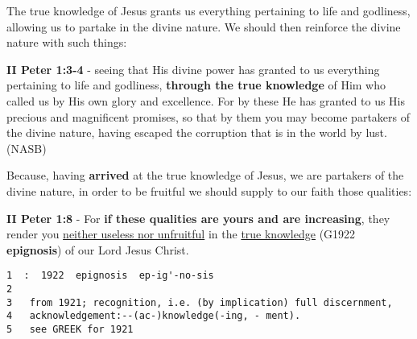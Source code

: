 \documentclass[11pt]{article}
\begin{document}
The true knowledge of Jesus grants us everything pertaining to life and godliness, allowing us to partake in the divine nature. We should then reinforce the divine nature with such things:

\textbf{II Peter 1:3-4} - seeing that His divine power has granted to us everything pertaining to life and godliness, \textbf{through the true knowledge} of Him who called us by His own glory and excellence. For by these He has granted to us His precious and magnificent promises, so that by them you may become partakers of the divine nature, having escaped the corruption that is in the world by lust. (NASB)

Because, having \textbf{arrived} at the true knowledge of Jesus, we are partakers of the divine nature, in order to be fruitful we should supply to our faith those qualities:

\textbf{II Peter 1:8} - For \textbf{if these qualities are yours and are increasing}, they render you \uline{neither useless nor unfruitful} in the \uline{true knowledge} (G1922 \textbf{epignosis}) of our Lord Jesus Christ.

\begin{verbatim}
1  :  1922  epignosis  ep-ig'-no-sis
2  
3   from 1921; recognition, i.e. (by implication) full discernment,
4   acknowledgement:--(ac-)knowledge(-ing, - ment).
5   see GREEK for 1921
\end{verbatim}
\end{document}
